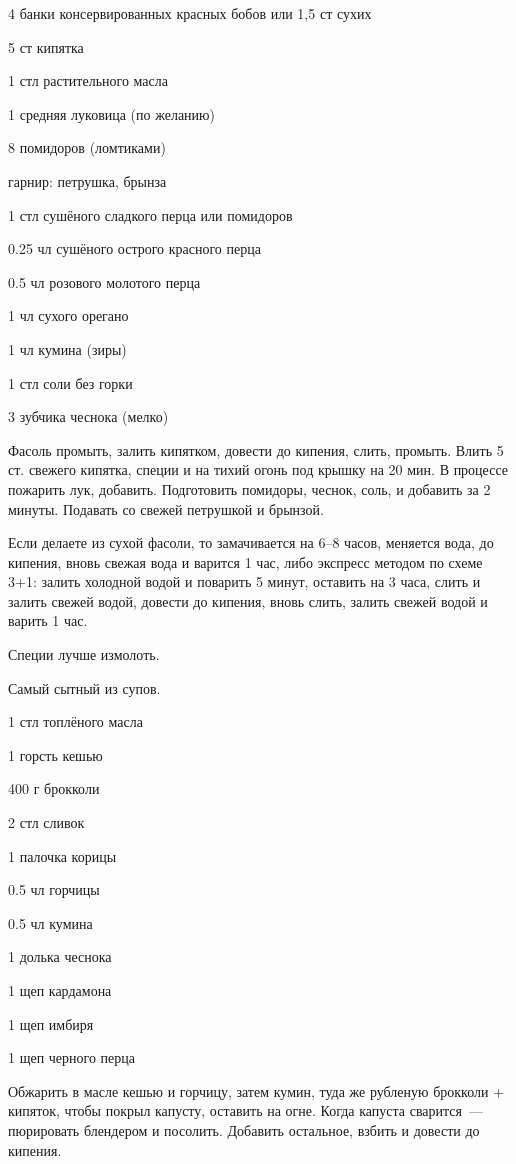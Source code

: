 {
\item 4 банки консервированных красных бобов или 1,5 ст сухих
\item 5 ст кипятка
\item 1 стл растительного масла
\item 1 средняя луковица (по желанию)
\item 8 помидоров (ломтиками)
\item гарнир: петрушка, брынза
}{
\item 1 стл сушёного сладкого перца или помидоров
\item 0.25 чл сушёного острого красного перца
\item 0.5 чл розового молотого перца
\item 1 чл сухого орегано
\item 1 чл кумина (зиры)
\item 1 стл соли без горки
\item 3 зубчика чеснока (мелко)
}{
Фасоль промыть, залить кипятком, довести до кипения, слить, промыть. Влить 5 ст. свежего кипятка, специи и на тихий огонь под крышку на 20 мин. В процессе пожарить лук, добавить. Подготовить помидоры, чеснок, соль, и добавить за 2 минуты. Подавать со свежей петрушкой и брынзой.

Если делаете из сухой фасоли, то замачивается на 6–8 часов, меняется вода, до кипения, вновь свежая вода и варится 1 час, либо экспресс методом по схеме 3+1: залить холодной водой и поварить 5 минут, оставить на 3 часа, слить и залить свежей водой, довести до кипения, вновь слить, залить свежей водой и варить 1 час.
}{
\begin{advice}
\item Специи лучше измолоть.
    \item Самый сытный из супов.
\end{advice}
}{}



{
\item 1 стл топлёного масла
\item 1 горсть кешью
\item 400 г брокколи
\item 2 стл сливок
}{
\item 1 палочка корицы
\item 0.5 чл горчицы
\item 0.5 чл кумина
\item 1 долька чеснока
\item 1 щеп кардамона
\item 1 щеп имбиря 
\item 1 щеп черного перца
}{
Обжарить в масле кешью и горчицу, затем кумин, туда же рубленую брокколи + кипяток, чтобы покрыл капусту, оставить на огне. Когда капуста сварится~--- пюрировать блендером и посолить. Добавить остальное, взбить и довести до кипения.
}{}{}



